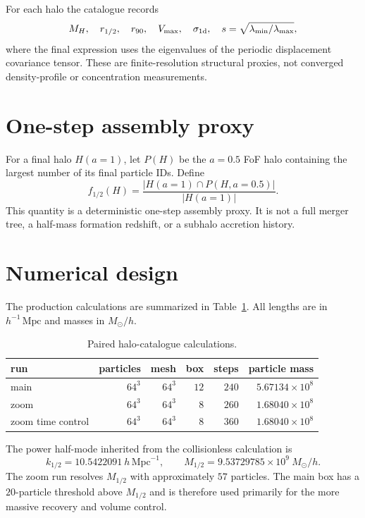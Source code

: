 For each halo the catalogue records
\begin{equation}
 M_H,
 \quad r_{1/2},
 \quad r_{90},
 \quad V_{\max},
 \quad \sigma_{1\rm d},
 \quad s=\sqrt{\lambda_{\min}/\lambda_{\max}},
\label{eq:halo-properties}
\end{equation}
where the final expression uses the eigenvalues of the periodic displacement covariance tensor.  These are finite-resolution structural proxies, not converged density-profile or concentration measurements.

\section{One-step assembly proxy}

For a final halo $H(a=1)$, let $P(H)$ be the $a=0.5$ FoF halo containing the largest number of its final particle IDs.  Define
\begin{equation}
 f_{1/2}(H)
 =\frac{|H(a=1)\cap P(H,a=0.5)|}{|H(a=1)|}.
\label{eq:assembly-proxy}
\end{equation}
This quantity is a deterministic one-step assembly proxy.  It is not a full merger tree, a half-mass formation redshift, or a subhalo accretion history.

\section{Numerical design}

The production calculations are summarized in Table~\ref{tab:halo-runs}.  All lengths are in $h^{-1}\,\mathrm{Mpc}$ and masses in $M_\odot/h$.

\begin{table}[htbp]
\centering
\caption{Paired halo-catalogue calculations.}
\label{tab:halo-runs}
\begin{tabular}{lrrrrr}
\toprule
run & particles & mesh & box & steps & particle mass\\
\midrule
main & $64^3$ & $64^3$ & $12$ & $240$ & $5.67134\times10^8$\\
zoom & $64^3$ & $64^3$ & $8$ & $260$ & $1.68040\times10^8$\\
zoom time control & $64^3$ & $64^3$ & $8$ & $360$ & $1.68040\times10^8$\\
\bottomrule
\end{tabular}
\end{table}

The power half-mode inherited from the collisionless calculation is
\begin{equation}
 k_{1/2}=10.5422091\ h\,\mathrm{Mpc}^{-1},
 \qquad
 M_{1/2}=9.53729785\times10^9\ M_\odot/h.
\label{eq:halo-half-mode}
\end{equation}
The zoom run resolves $M_{1/2}$ with approximately $57$ particles.  The main box has a $20$-particle threshold above $M_{1/2}$ and is therefore used primarily for the more massive recovery and volume control.

